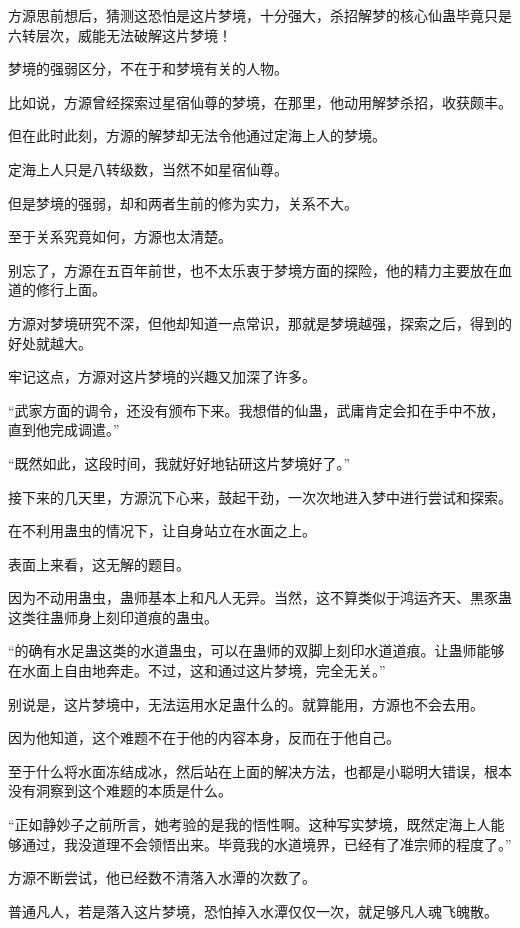 \begin{this_body}
方源思前想后，猜测这恐怕是这片梦境，十分强大，杀招解梦的核心仙蛊毕竟只是六转层次，威能无法破解这片梦境！

梦境的强弱区分，不在于和梦境有关的人物。

比如说，方源曾经探索过星宿仙尊的梦境，在那里，他动用解梦杀招，收获颇丰。

但在此时此刻，方源的解梦却无法令他通过定海上人的梦境。

定海上人只是八转级数，当然不如星宿仙尊。

但是梦境的强弱，却和两者生前的修为实力，关系不大。

至于关系究竟如何，方源也太清楚。

别忘了，方源在五百年前世，也不太乐衷于梦境方面的探险，他的精力主要放在血道的修行上面。

方源对梦境研究不深，但他却知道一点常识，那就是梦境越强，探索之后，得到的好处就越大。

牢记这点，方源对这片梦境的兴趣又加深了许多。

“武家方面的调令，还没有颁布下来。我想借的仙蛊，武庸肯定会扣在手中不放，直到他完成调遣。”

“既然如此，这段时间，我就好好地钻研这片梦境好了。”

接下来的几天里，方源沉下心来，鼓起干劲，一次次地进入梦中进行尝试和探索。

在不利用蛊虫的情况下，让自身站立在水面之上。

表面上来看，这无解的题目。

因为不动用蛊虫，蛊师基本上和凡人无异。当然，这不算类似于鸿运齐天、黒豕蛊这类往蛊师身上刻印道痕的蛊虫。

“的确有水足蛊这类的水道蛊虫，可以在蛊师的双脚上刻印水道道痕。让蛊师能够在水面上自由地奔走。不过，这和通过这片梦境，完全无关。”

别说是，这片梦境中，无法运用水足蛊什么的。就算能用，方源也不会去用。

因为他知道，这个难题不在于他的内容本身，反而在于他自己。

至于什么将水面冻结成冰，然后站在上面的解决方法，也都是小聪明大错误，根本没有洞察到这个难题的本质是什么。

“正如静妙子之前所言，她考验的是我的悟性啊。这种写实梦境，既然定海上人能够通过，我没道理不会领悟出来。毕竟我的水道境界，已经有了准宗师的程度了。”

方源不断尝试，他已经数不清落入水潭的次数了。

普通凡人，若是落入这片梦境，恐怕掉入水潭仅仅一次，就足够凡人魂飞魄散。


\end{this_body}
